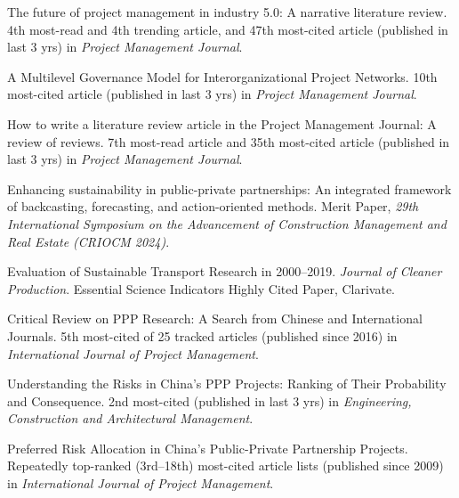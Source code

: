 \documentclass[11pt,a4paper]{report} %
\begin{document}
    \begin{tablist}

        \item[2026] \tab{}The future of project management in industry 5.0: A narrative literature review. 4th most-read and 4th trending article, and 47th most-cited article (published in last 3 yrs) in \textit{Project Management Journal}.
        
        \item[2026] \tab{}A Multilevel Governance Model for Interorganizational Project Networks. 10th most-cited article (published in last 3 yrs) in \textit{Project Management Journal}.  
        
        \item[2025--26] \tab{}How to write a literature review article in the Project Management Journal: A review of reviews. 7th most-read article and 35th most-cited article (published in last 3 yrs) in \textit{Project Management Journal}.
        
        \item[2024] \tab{}Enhancing sustainability in public-private partnerships: An integrated framework of backcasting, forecasting, and action-oriented methods.  Merit Paper, \textit{29th International Symposium on the Advancement of Construction Management and Real Estate (CRIOCM 2024)}.
        
        \item[2021] \tab{}Evaluation of Sustainable Transport Research in 2000--2019. \textit{Journal of Cleaner Production}. Essential Science Indicators Highly Cited Paper, Clarivate.  
        
        \item[2019] \tab{}Critical Review on PPP Research: A Search from Chinese and International Journals. 5th most-cited of 25 tracked articles (published since 2016) in \textit{International Journal of Project Management}.  
        
        \item[2018] \tab{}Understanding the Risks in China's PPP Projects: Ranking of Their Probability and Consequence. 2nd most-cited (published in last 3 yrs) in \textit{Engineering, Construction and Architectural Management}.  
        
        \item[2013--15] \tab{}Preferred Risk Allocation in China's Public-Private Partnership Projects. Repeatedly top-ranked (3rd--18th) most-cited article lists (published since 2009) in \textit{International Journal of Project Management}.  
        

\end{tablist}
\end{document}
